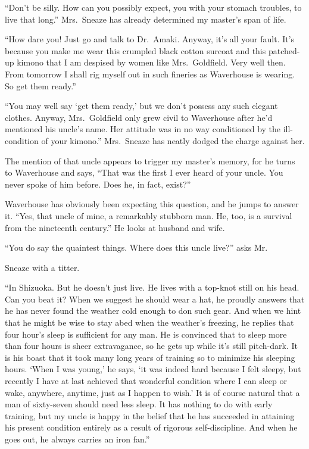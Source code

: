\documentclass{book}
\begin{document}
``Don't be silly. How can you possibly expect, you with your stomach
troubles, to live that long.'' Mrs.~Sneaze has already determined my
master's span of life.

``How dare you! Just go and talk to Dr.~Amaki. Anyway, it's all your
fault. It's because you make me wear this crumpled black cotton surcoat
and this patched-up kimono that I am despised by women like
Mrs.~Goldfield. Very well then. From tomorrow I shall rig myself out in
such fineries as Waverhouse is wearing. So get them ready.''

``You may well say `get them ready,' but we don't possess any such
elegant clothes. Anyway, Mrs.~Goldfield only grew civil to Waverhouse
after he'd mentioned his uncle's name. Her attitude was in no way
conditioned by the ill-condition of your kimono.'' Mrs.~Sneaze has
neatly dodged the charge against her.

The mention of that uncle appears to trigger my master's memory, for he
turns to Waverhouse and says, ``That was the first I ever heard of your
uncle. You never spoke of him before. Does he, in fact, exist?''

Waverhouse has obviously been expecting this question, and he jumps to
answer it. ``Yes, that uncle of mine, a remarkably stubborn man. He,
too, is a survival from the nineteenth century.'' He looks at husband
and wife.

``You do say the quaintest things. Where does this uncle live?'' asks
Mr.

Sneaze with a titter.

``In Shizuoka. But he doesn't just live. He lives with a top-knot still
on his head. Can you beat it? When we suggest he should wear a hat, he
proudly answers that he has never found the weather cold enough to don
such gear. And when we hint that he might be wise to stay abed when the
weather's freezing, he replies that four hour's sleep is sufficient for
any man. He is convinced that to sleep more than four hours is sheer
extravagance, so he gets up while it's still pitch-dark. It is his boast
that it took many long years of training so to minimize his sleeping
hours. `When I was young,' he says, `it was indeed hard because I felt
sleepy, but recently I have at last achieved that wonderful condition
where I can sleep or wake, anywhere, anytime, just as I happen to wish.'
It is of course natural that a man of sixty-seven should need less
sleep. It has nothing to do with early training, but my uncle is happy
in the belief that he has succeeded in attaining his present condition
entirely as a result of rigorous self-discipline. And when he goes out,
he always carries an iron fan.''
\end{document}
